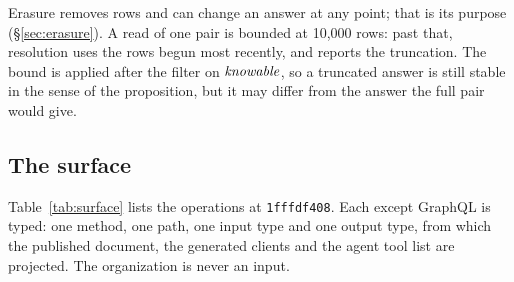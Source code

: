 \begin{remark}
Erasure removes rows and can change an answer at any point; that is its purpose
(\S\ref{sec:erasure}). A read of one pair is bounded at 10{,}000 rows: past
that, resolution uses the rows begun most recently, and  reports
the truncation. The bound is applied after the filter on $\mathit{knowable}$, so a
truncated answer is still stable in the sense of the proposition, but it may
differ from the answer the full pair would give.
\end{remark}

\subsection{The surface}

\shipped{} Table~\ref{tab:surface} lists the operations at \texttt{1fffdf408}.
Each except GraphQL is typed: one method, one path, one input type and one
output type, from which the published document, the generated clients and the
agent tool list are projected. The organization is never an input.

